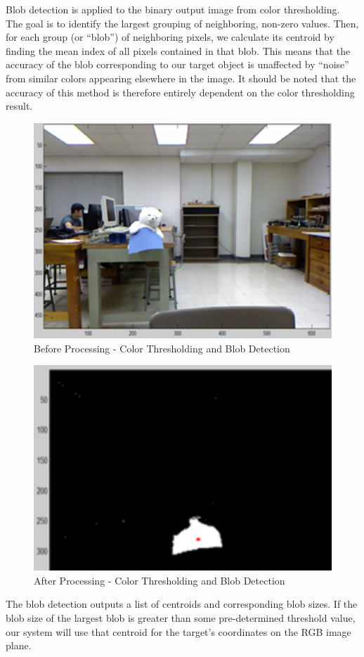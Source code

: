 Blob detection is applied to the binary output image from color thresholding.  The goal is to identify the largest grouping of neighboring, non-zero values.  Then, for each group (or “blob”) of neighboring pixels, we calculate its centroid by finding the mean index of all pixels contained in that blob.  This means that the accuracy of the blob corresponding to our target object is unaffected by “noise” from similar colors appearing elsewhere in the image.  It should be noted that the accuracy of this method is therefore entirely dependent on the color thresholding result.  

\begin{figure}[htbp]
\begin{center}
\includegraphics[width=5in]{4}
\caption{Before Processing - Color Thresholding and Blob Detection} \label{fig:4}
\end{center}
\end{figure}

\begin{figure}[htbp]
\begin{center}
\includegraphics[width=5in]{5}
\caption{After Processing - Color Thresholding and Blob Detection} \label{fig:5}
\end{center}
\end{figure}
The blob detection outputs a list of centroids and corresponding blob sizes.  If the blob size of the largest blob is greater than some pre-determined threshold value, our system will use that centroid for the target’s coordinates on the RGB image plane. 


